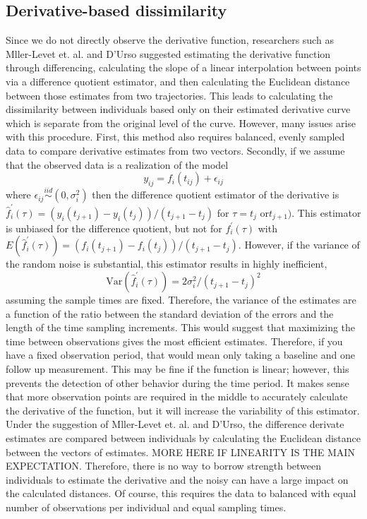\subsection{Derivative-based dissimilarity}
 Since we do not directly observe the derivative function, researchers such as Mller-Levet et. al. \cite{moller2003} and D'Urso \cite{d2000} suggested estimating the derivative function through differencing, calculating the slope of a linear interpolation between points via a difference quotient estimator, and then calculating the Euclidean distance between those estimates from two trajectories. This leads to calculating the dissimilarity between individuals based only on their estimated derivative curve which is separate from the original level of the curve. However, many issues arise with this procedure. First, this method also requires balanced, evenly sampled data to compare derivative estimates from two vectors. Secondly, if we assume that the observed data is a realization of the model
$$y_{ij}= f_i(t_{ij})+\epsilon_{ij}$$
where $\epsilon_{ij}\overset{iid}{\sim} (0,\sigma_{i}^{2})$ then the difference quotient estimator of the derivative is $\hat{f}_{i}^{'}(\tau) = (y_i(t_{j+1})-y_i(t_j))/(t_{j+1}-t_j)$ for $\tau= t_{j}$ or$ t_{j+1})$. This estimator is unbiased for the difference quotient, but not for $f_{i}^{'}(\tau)$ with $E(\hat{f}_{i}^{'}(\tau)) = (f_i(t_{j+1})-f_i(t_j))/(t_{j+1}-t_j)$. However, if the variance of the random noise is substantial, this estimator results in highly inefficient,
$$\text{Var}(\hat{f}_{i}^{'}(\tau)) =  2\sigma^{2}_{i}/ (t_{j+1}-t_j)^{2}$$
assuming the sample times are fixed. Therefore, the variance of the estimates are a function of the ratio between the standard deviation of the errors and the length of the time sampling increments. This would suggest that maximizing the time between observations gives the most efficient estimates. Therefore, if you have a fixed observation period, that would mean only taking a baseline and one follow up measurement. This may be fine if the function is linear; however, this prevents the detection of other behavior during the time period. It makes sense that more observation points are required in the middle to accurately calculate the derivative of the function, but it will increase the variability of this estimator. Under the suggestion of Mller-Levet et. al. and D'Urso, the difference derivate estimates are compared between individuals by calculating the Euclidean distance between the vectors of estimates. MORE HERE IF LINEARITY IS THE MAIN EXPECTATION. Therefore, there is no way to borrow strength between individuals to estimate the derivative and the noisy can have a large impact on the calculated distances. Of course, this requires the data to balanced with equal number of observations per individual and equal sampling times. \\\\ 
